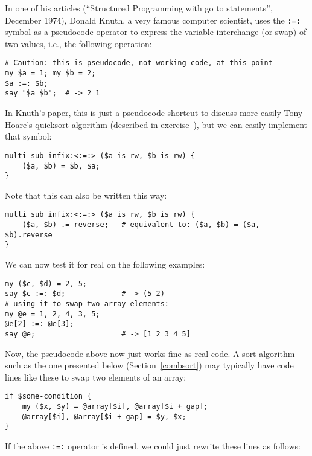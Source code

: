 In one of his articles (``Structured Programming with 
go to statements'', December 1974), Donald Knuth, a very famous 
computer scientist, uses the \verb':=:' symbol as a 
pseudocode operator to express the variable interchange 
(or swap) of two values, i.e., the following operation:

\begin{verbatim}
# Caution: this is pseudocode, not working code, at this point
my $a = 1; my $b = 2;
$a :=: $b; 
say "$a $b";  # -> 2 1 
\end{verbatim}

In Knuth's paper, this is just a pseudocode shortcut 
to discuss more easily Tony Hoare's quicksort algorithm 
(described in exercise~), 
but we can easily implement that symbol:

\begin{verbatim}
multi sub infix:<:=:> ($a is rw, $b is rw) {
    ($a, $b) = $b, $a;
}
\end{verbatim}

Note that this can also be written this way:

\begin{verbatim}
multi sub infix:<:=:> ($a is rw, $b is rw) {
    ($a, $b) .= reverse;   # equivalent to: ($a, $b) = ($a, $b).reverse 
}
\end{verbatim}

We can now test it for real on the following examples:

\begin{verbatim}
my ($c, $d) = 2, 5;
say $c :=: $d;             # -> (5 2)
# using it to swap two array elements:
my @e = 1, 2, 4, 3, 5;
@e[2] :=: @e[3];
say @e;                    # -> [1 2 3 4 5]
\end{verbatim}

Now, the pseudocode above now just works fine as real code. 
A sort algorithm such as the one presented below 
(Section~\ref{combsort}) may typically have code lines 
like these to swap two elements of an array:

\begin{verbatim}
if $some-condition {
    my ($x, $y) = @array[$i], @array[$i + gap];
    @array[$i], @array[$i + gap] = $y, $x;
}
\end{verbatim}

If the above  \verb':=:' operator is defined, we 
could just rewrite these lines as follows:

